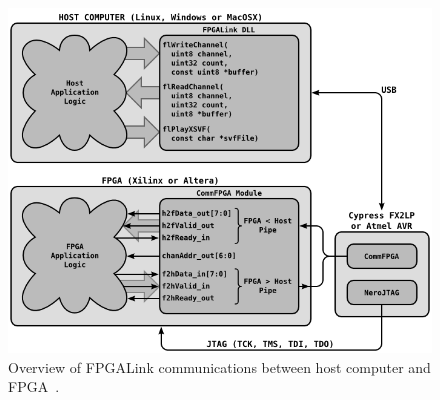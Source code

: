 \begin{figure}[h]
	\begin{center}
		\includegraphics[width=150mm]{figures/fpgalinkOverview.png}
		\captionfonts
		\caption{Overview of FPGALink communications between host computer and FPGA~\cite{fpgalink}.}
		\label{fig:fpgalink}
	\end{center}
\end{figure}
